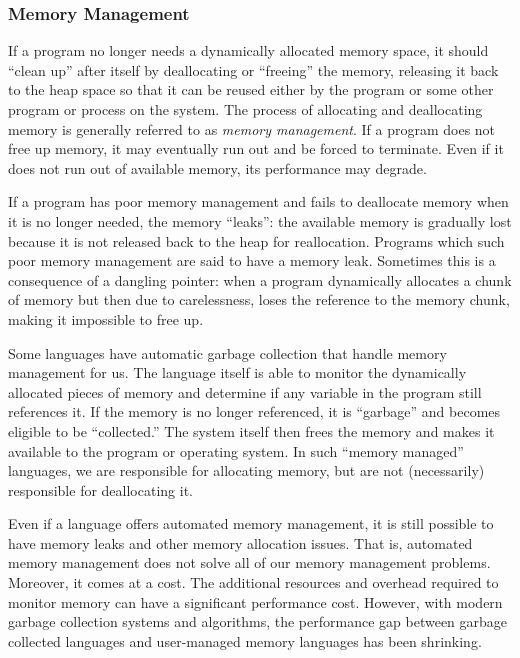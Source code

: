\subsubsection{Memory Management}

If a program no longer needs a dynamically allocated memory space, 
it should ``clean up'' after itself by deallocating or ``freeing'' the memory, 
releasing it back to the heap space so that it can be reused either by 
the program or some other program or process on the system.
The process of allocating and deallocating memory is generally
referred to as \emph{memory management}.  If a program does not
free up memory, it may eventually run out and be forced to terminate.  
Even if it does not run out of available memory, its performance may 
degrade.  

If a program has poor memory management and fails to deallocate
memory when it is no longer needed, the memory ``leaks'': the available
memory is gradually lost because it is not released back to the 
heap for reallocation.  Programs which such poor memory management
are said to have a \gls{memory leak}. Sometimes
this is a consequence of a \gls{dangling pointer}: when a program
dynamically allocates a chunk of memory but then due to carelessness,
loses the reference to the memory chunk, making it impossible
to free up.

Some languages have automatic \gls{garbage collection} that
handle memory management for us.  The language itself is
able to monitor the dynamically allocated pieces of memory 
and determine if any variable in the program still references it.
If the memory is no longer referenced, it is ``garbage'' and
becomes eligible to be ``collected.''  The system itself then
frees the memory and makes it available to the program or
operating system.  In such ``memory managed'' languages, 
we are responsible for allocating memory, but are not (necessarily)
responsible for deallocating it.  

Even if a language offers automated memory management, 
it is still possible to have memory leaks and other memory
allocation issues.  That is, automated memory management
does not solve all of our memory management problems.  
Moreover, it comes at a cost.  The additional resources and
overhead required to monitor memory can have a significant
performance cost.  However, with modern garbage collection
systems and algorithms, the performance gap between
garbage collected languages and user-managed memory
languages has been shrinking.

